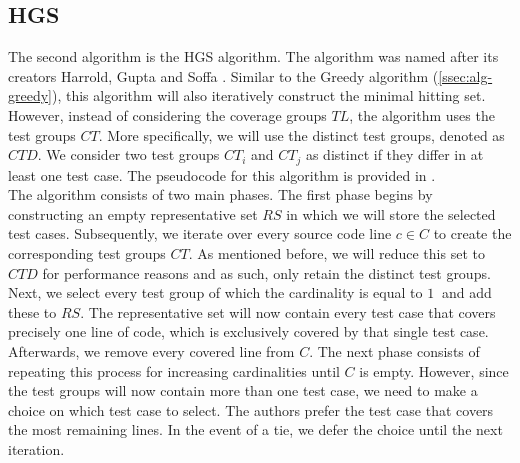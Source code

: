
\subsection{HGS}\label{ssec:alg-hgs}
The second algorithm is the HGS algorithm. The algorithm was named after its creators Harrold, Gupta and Soffa \cite{hgs}. Similar to the Greedy algorithm (\cref{ssec:alg-greedy}), this algorithm will also iteratively construct the minimal hitting set. However, instead of considering the coverage groups $TL$, the algorithm uses the test groups $CT$. More specifically, we will use the distinct test groups, denoted as $CTD$. We consider two test groups $CT_i$ and $CT_j$ as distinct if they differ in at least one test case. The pseudocode for this algorithm is provided in .\\

\noindent The algorithm consists of two main phases. The first phase begins by constructing an empty representative set $RS$ in which we will store the selected test cases. Subsequently, we iterate over every source code line $c \in C$ to create the corresponding test groups $CT$. As mentioned before, we will reduce this set to $CTD$ for performance reasons and as such, only retain the distinct test groups. Next, we select every test group of which the cardinality is equal to $\SI{1}{}$ and add these to $RS$. The representative set will now contain every test case that covers precisely one line of code, which is exclusively covered by that single test case. Afterwards, we remove every covered line from $C$. The next phase consists of repeating this process for increasing cardinalities until $C$ is empty. However, since the test groups will now contain more than one test case, we need to make a choice on which test case to select. The authors prefer the test case that covers the most remaining lines. In the event of a tie, we defer the choice until the next iteration.\\

